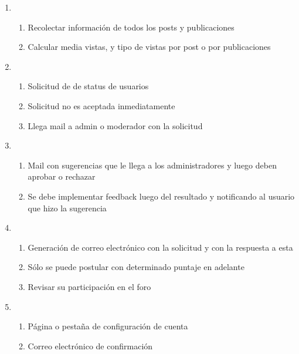 \documentclass[12pt, letterpaper, notitlepage]{article}
\begin{document}
\begin{enumerate}
			\item {}
    	\begin{enumerate}
			\item Recolectar información de todos los posts y publicaciones
			\item Calcular media vistas, y tipo de vistas por post o por publicaciones
		\end{enumerate}
		
	\item {}
		\begin{enumerate}
			\item Solicitud de  de status de usuarios
			\item Solicitud no es aceptada inmediatamente
			\item Llega mail a admin o moderador con la solicitud
		\end{enumerate}
		
	\item {}
		\begin{enumerate}
			\item Mail con sugerencias que le llega a los administradores y luego deben aprobar o rechazar
			\item Se debe implementar feedback luego del resultado y notificando al usuario que hizo la sugerencia
		\end{enumerate}	
		
		
	\item {}
		\begin{enumerate}
			\item Generación de correo electrónico con la solicitud y con la respuesta a esta
			\item Sólo se puede postular con determinado puntaje en adelante
			\item Revisar su participación en el foro
		\end{enumerate}
		
	\item {}
    	\begin{enumerate}
			\item Página o pestaña de configuración de cuenta
			\item Correo electrónico de confirmación
		\end{enumerate}


\end{enumerate}
\end{document}
